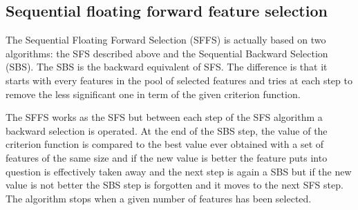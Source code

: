 \documentclass[a4paper,11pt,DIV=16]{scrartcl}
\begin{document}
    \begin{table}[!ht]
        \caption{Criterion functions values corresponding to Figure~\ref{fig:expl_dataset} dataset (50\% for training/50\% for testing).\label{tab:expl_metric}}
    \end{table}


    \subsection{Sequential floating forward feature selection}
    \label{sec:floating-presentation}

    The Sequential Floating Forward Selection (SFFS) is actually based on two algorithms: the SFS described above and the Sequential Backward Selection (SBS). The SBS is the backward equivalent of SFS. The difference is that it starts with every features in the pool of selected features and tries at each step to remove the less significant one in term of the given criterion function.

    The SFFS works as the SFS but between each step of the SFS algorithm a backward selection is operated. At the end of the SBS step, the value of the criterion function is compared to the best value ever obtained with a set of features of the same size and if the new value is better the feature puts into question is effectively taken away and the next step is again a SBS but if the new value is not better the SBS step is forgotten and it moves to the next SFS step. The algorithm stops when a given number of features has been selected.
\end{document}
